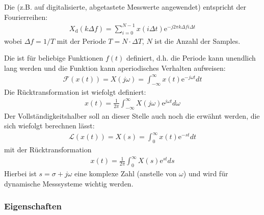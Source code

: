 \documentclass[letterpaper,10pt,english]{jupyterBook}
\begin{document}
\sphinxAtStartPar
Die  (z.B. auf digitalisierte, abgetastete Messwerte angewendet) entspricht der Fourierreihen:
\begin{equation*}
\begin{split}X_\mathrm d (k \Delta f) = \sum_{i = 0}^{N-1} x(i\Delta t) \mathrm e^{-j 2\pi  k \Delta f i \Delta t}\end{split}
\end{equation*}
\sphinxAtStartPar
wobei \(\Delta f = 1/T\) mit der Periode \(T = N\cdot \Delta T\), \(N\) ist die Anzahl der Samples.

\sphinxAtStartPar
Die  ist für beliebige Funktionen \(f(t)\) definiert, d.h. die Periode kann unendlich lang werden und die Funktion kann aperiodisches Verhalten aufweisen:
\begin{equation*}
\begin{split}\mathcal F(x(t)) = X(j\omega) = \int_{-\infty}^{\infty} x(t) \mathrm e^{-j \omega t} dt\end{split}
\end{equation*}
\sphinxAtStartPar
Die Rücktransformation ist wiefolgt definiert:
\begin{equation*}
\begin{split}x(t) = \frac{1}{2\pi}\int_{-\infty}^{\infty} X(j\omega) \mathrm e^{j \omega t} d\omega\end{split}
\end{equation*}
\sphinxAtStartPar
Der Vollständigkeitshalber soll an dieser Stelle auch noch die  erwähnt werden, die sich wiefolgt berechnen lässt:
\begin{equation*}
\begin{split}\mathcal L(x(t)) = X(s) = \int_{0}^{\infty} x(t) \mathrm e^{-st} dt\end{split}
\end{equation*}
\sphinxAtStartPar
mit der Rücktransformation
\begin{equation*}
\begin{split}x(t) = \frac{1}{2\pi}\int_{0}^{\infty} X(s) \mathrm e^{st} ds\end{split}
\end{equation*}
\sphinxAtStartPar
Hierbei ist \(s= \sigma + j\omega\) eine komplexe Zahl (anstelle von \(\omega\)) und wird für dynamische Messsysteme wichtig werden.


\subsubsection{Eigenschaften}
\label{\detokenize{content/3_FourierAnalyse:eigenschaften}}
\sphinxAtStartPar
\end{document}
